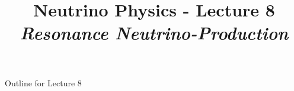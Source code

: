 \renewcommand{\thislecture}{8 }

%
%

\title[Neutrino Physics / Lecture \thislecture]
{
  {\huge \color{yellow} Neutrino Physics - Lecture \thislecture} \\
  {\it Resonance Neutrino-Production}\\
}



\begin{frame}[plain]
  \titlepage
\end{frame}

%
%

\begin{frame}{Outline for Lecture \thislecture}


\end{frame}

